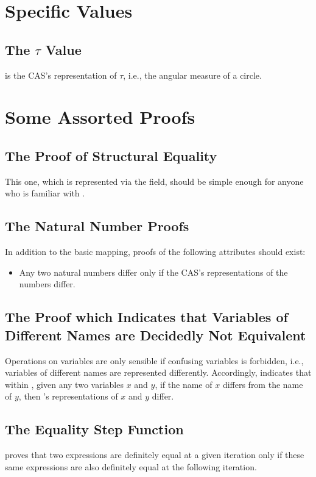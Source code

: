 \documentclass{report}
\begin{document}
\section{Specific Values}

\subsection{The \(\tau\) Value}
  is the  CAS's representation of \(\tau\), i.e., the angular measure of a circle.

\section{Some Assorted Proofs}

\subsection{The Proof of Structural Equality}
This one, which is represented via the  field, should be simple enough for anyone who is familiar with .

\subsection{The Natural Number Proofs}
In addition to the basic mapping, proofs of the following attributes should exist:

\begin{itemize}
  \item Any two natural numbers differ only if the CAS's representations of the numbers differ.
\end{itemize}

\subsection{The Proof which Indicates that Variables of Different Names are Decidedly Not Equivalent}
Operations on variables are only sensible if confusing variables is forbidden, i.e., variables of different names are represented differently.  Accordingly,   indicates that within , given any two variables \(x\) and \(y\), if the name of \(x\) differs from the name of \(y\), then 's representations of \(x\) and \(y\) differ.

\subsection{The Equality Step Function}
 proves that two expressions are definitely equal at a given iteration only if these same expressions are also definitely equal at the following iteration.
\end{document}
